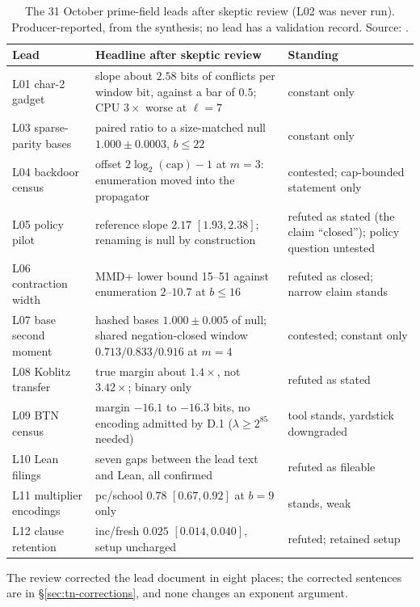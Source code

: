 \begin{table}[t]
\centering\small
\begin{tabularx}{\linewidth}{@{}lXX@{}}
\toprule
Lead & Headline after skeptic review & Standing \\
\midrule
L01 char-2 gadget & slope about $2.58$ bits of conflicts per window bit, against a bar of $0.5$; CPU $3\times$ worse at $\ell=7$ & constant only \\
L03 sparse-parity bases & paired ratio to a size-matched null $1.000\pm0.0003$, $b\le22$ & constant only \\
L04 backdoor census & offset $2\log_2(\mathrm{cap})-1$ at $m=3$: enumeration moved into the propagator & contested; cap-bounded statement only \\
L05 policy pilot & reference slope $2.17$ $[1.93,2.38]$; renaming is null by construction & refuted as stated (the claim ``closed''); policy question untested \\
L06 contraction width & MMD+ lower bound 15--51 against enumeration $2$--$10.7$ at $b\le16$ & refuted as closed; narrow claim stands \\
L07 base second moment & hashed bases $1.000\pm0.005$ of null; shared negation-closed window $0.713/0.833/0.916$ at $m=4$ & contested; constant only \\
L08 Koblitz transfer & true margin about $1.4\times$, not $3.42\times$; binary only & refuted as stated \\
L09 BTN census & margin $-16.1$ to $-16.3$ bits, no encoding admitted by D.1 ($\lambda\ge2^{85}$ needed) & tool stands, yardstick downgraded \\
L10 Lean filings & seven gaps between the lead text and Lean, all confirmed & refuted as fileable \\
L11 multiplier encodings & pc/school $0.78$ $[0.67,0.92]$ at $b=9$ only & stands, weak \\
L12 clause retention & inc/fresh $0.025$ $[0.014,0.040]$, setup uncharged & refuted; retained setup \\
\bottomrule
\end{tabularx}
\caption[]{The 31 October prime-field leads after skeptic review (L02 was
never run). Producer-reported, from the synthesis; no lead has a validation
record. Source: .}
\label{tab:pa-eth}
\end{table}

The review corrected the lead document in eight places; the corrected
sentences are in \S\ref{sec:tn-corrections}, and none changes an exponent
argument.

